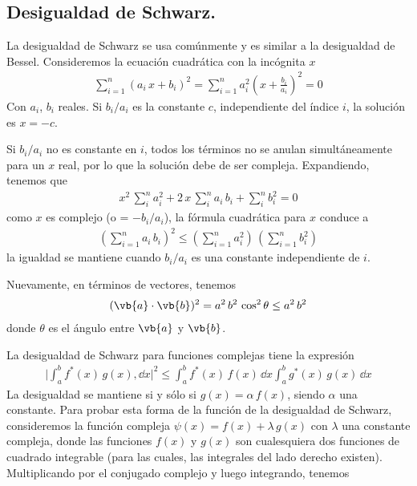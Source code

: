 \subsection{Desigualdad de Schwarz.}
 La desigualdad de Schwarz se usa comúnmente y es similar a la desigualdad de Bessel. Consideremos la ecuación cuadrática con la incógnita $x$
 \begin{align}
\sum_{i=1}^{n} (a_{i} \, x + b_{i})^{2} = \sum_{i=1}^{n} a_{i}^{2} \left( x + \frac{b_{i}}{a_{i}} \right)^{2} = 0
\label{eq:ecuacion_10_74}
\end{align}
Con $a_{i}$, $b_{i}$ reales. Si $b_{i}/a_{i}$ es la constante $c$, independiente del índice $i$, la solución es $x= - c$. 
\par
Si $b_{i}/a_{i}$ no es constante en $i$, todos los términos no se anulan simultáneamente para un $x$ real, por lo que la solución debe de ser compleja. Expandiendo, tenemos que
\begin{align}
x^{2} \, \sum_{i}^{n} a_{i}^{2} + 2 \, x \, \sum_{i}^{n} a_{i} \, b_{i} + \sum_{i}^{n} b_{i}^{2} = 0
\label{eq:ecuacion_10_75}
\end{align}
como $x$ es complejo (o = $-b_{i}/a_{i}$), la fórmula cuadrática para $x$ conduce a 
\begin{align}
\left( \sum_{i=1}^{n} a_{i} \, b_{i} \right)^{2} \leq \left( \sum_{i=1}^{n} a_{i}^{2} \right) \, \left( \sum_{i=1}^{n} b_{i}^{2} \right)
\label{eq:ecuacion_10_76}
\end{align}
la igualdad se mantiene cuando $b_{i}/a_{i}$ es una constante independiente de $i$.
\par
Nuevamente, en términos de vectores, tenemos
\begin{align}
( \vb{a} \cdot \vb{b} )^{2} =  a^{2} \, b^{2} \, \cos^{2} \theta \leq a^{2} \, b^{2}
\label{eq:ecuacion_10_77}
\end{align}
donde $\theta$ es el ángulo entre $\vb{a}$ y $\vb{b}$.
\par
La desigualdad de Schwarz para funciones complejas tiene la expresión
\begin{align}
\boxed{
\Bigg\vert \int_{a}^{b} f^{*} (x) \, g(x) , \dd{x} \Bigg\vert^{2} \leq \int_{a}^{b} f^{*}(x) \, f(x) \, \dd{x} \int_{a}^{b} g^{*}(x) \, g(x) \, \dd{x}}
\label{eq:ecuacion_10_78}
\end{align}
La desigualdad se mantiene si y sólo si $g(x) = \alpha \, f(x)$, siendo $\alpha$ una constante. Para probar esta forma de la función de la desigualdad de Schwarz, consideremos la función compleja $\psi(x) = f(x) + \lambda \, g(x)$ con $\lambda$ una constante compleja, donde las funciones $f(x)$ y $g(x)$ son cualesquiera dos funciones de cuadrado integrable (para las cuales, las integrales del lado derecho existen). Multiplicando por el conjugado complejo y luego integrando, tenemos
